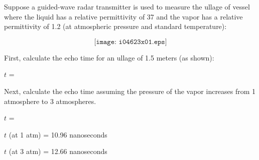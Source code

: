 

Suppose a guided-wave radar transmitter is used to measure the ullage of vessel where the liquid has a relative permittivity of 37 and the vapor has a relative permittivity of 1.2 (at atmospheric pressure and standard temperature):

$$\texttt{[image: i04623x01.eps]}$$

First, calculate the echo time for an ullage of 1.5 meters (as shown):

\vskip 10pt

$t$ = \underbar{\hskip 50pt}

\vskip 20pt

Next, calculate the echo time assuming the pressure of the vapor increases from 1 atmosphere to 3 atmospheres.

\vskip 10pt

$t$ = \underbar{\hskip 50pt}







$t$ (at 1 atm) = 10.96 nanoseconds

\vskip 10pt

$t$ (at 3 atm) = 12.66 nanoseconds










